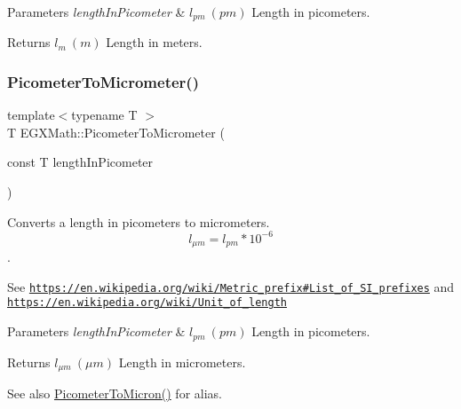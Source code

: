 \begin{DoxyParams}{Parameters}
{\em length\+In\+Picometer} & $ l_{pm}\ (pm)$ Length in picometers. \\
\hline
\end{DoxyParams}
\begin{DoxyReturn}{Returns}
$ l_{m}\ (m)$ Length in meters. 
\end{DoxyReturn}
\mbox{\label{group___e_g_x_math-_conversions-_length_conversions-_picometer-_s_i_gacf7ccbf7130894f8a9075cb9fd66c67d}} 
\subsubsection{\texorpdfstring{Picometer\+To\+Micrometer()}{PicometerToMicrometer()}}
{\footnotesize\ttfamily template$<$typename T $>$ \\
T E\+G\+X\+Math\+::\+Picometer\+To\+Micrometer (\begin{DoxyParamCaption}\item[{const T}]{length\+In\+Picometer }\end{DoxyParamCaption})}



Converts a length in picometers to micrometers. \[ l_{\mu m}=l_{pm} * 10^{-6} \]. 

See \href{https://en.wikipedia.org/wiki/Metric_prefix#List_of_SI_prefixes}{\tt https\+://en.\+wikipedia.\+org/wiki/\+Metric\+\_\+prefix\#\+List\+\_\+of\+\_\+\+S\+I\+\_\+prefixes} and \href{https://en.wikipedia.org/wiki/Unit_of_length}{\tt https\+://en.\+wikipedia.\+org/wiki/\+Unit\+\_\+of\+\_\+length} 
\begin{DoxyParams}{Parameters}
{\em length\+In\+Picometer} & $ l_{pm}\ (pm)$ Length in picometers. \\
\hline
\end{DoxyParams}
\begin{DoxyReturn}{Returns}
$ l_{\mu m}\ (\mu m)$ Length in micrometers. 
\end{DoxyReturn}
\begin{DoxySeeAlso}{See also}
\mbox{\hyperlink{group___e_g_x_math-_conversions-_length_conversions-_picometer-_non-_s_i_gad8fddabe74b111596888c370081f725e}{Picometer\+To\+Micron()}} for alias. 
\end{DoxySeeAlso}
\mbox{\label{group___e_g_x_math-_conversions-_length_conversions-_picometer-_s_i_gac6c5e481bf86b5c0d2ed7fa6a06a4c8e}} 
